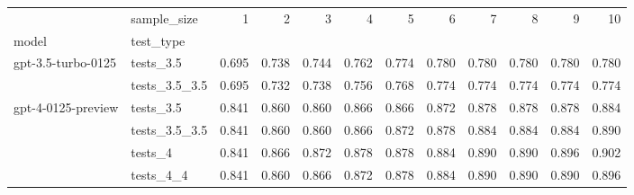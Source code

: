 \begin{tabular}{llrrrrrrrrrr}
\toprule
 & sample_size & 1 & 2 & 3 & 4 & 5 & 6 & 7 & 8 & 9 & 10 \\
model & test_type &  &  &  &  &  &  &  &  &  &  \\
\midrule
\multirow[t]{2}{*}{gpt-3.5-turbo-0125} & tests_3.5 & 0.695 & 0.738 & 0.744 & 0.762 & 0.774 & 0.780 & 0.780 & 0.780 & 0.780 & 0.780 \\
 & tests_3.5_3.5 & 0.695 & 0.732 & 0.738 & 0.756 & 0.768 & 0.774 & 0.774 & 0.774 & 0.774 & 0.774 \\
\cline{1-12}
\multirow[t]{4}{*}{gpt-4-0125-preview} & tests_3.5 & 0.841 & 0.860 & 0.860 & 0.866 & 0.866 & 0.872 & 0.878 & 0.878 & 0.878 & 0.884 \\
 & tests_3.5_3.5 & 0.841 & 0.860 & 0.860 & 0.866 & 0.872 & 0.878 & 0.884 & 0.884 & 0.884 & 0.890 \\
 & tests_4 & 0.841 & 0.866 & 0.872 & 0.878 & 0.878 & 0.884 & 0.890 & 0.890 & 0.896 & 0.902 \\
 & tests_4_4 & 0.841 & 0.860 & 0.866 & 0.872 & 0.878 & 0.884 & 0.890 & 0.890 & 0.890 & 0.896 \\
\cline{1-12}
\bottomrule
\end{tabular}
